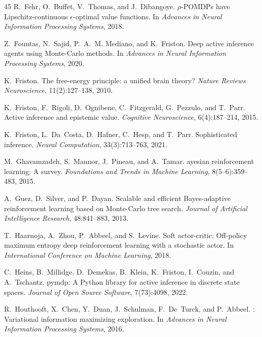 \documentclass{article}
\begin{document}
{\begin{thebibliography}{45}
R.~Fehr, O.~Buffet, V.~Thomas, and J.~Dibangoye.
\newblock $\rho$-{POMDP}s have {L}ipschitz-continuous $\epsilon$-optimal value functions.
\newblock In \emph{Advances in Neural Information Processing Systems}, 2018.

Z.~Fountas, N.~Sajid, P.~A.~M. Mediano, and K.~Friston.
\newblock Deep active inference agents using {M}onte-{C}arlo methods.
\newblock In \emph{Advances in Neural Information Processing Systems}, 2020.

K.~Friston.
\newblock The free-energy principle: a unified brain theory?
\newblock \emph{Nature Reviews Neuroscience}, 11(2):127--138, 2010.

K.~Friston, F.~Rigoli, D.~Ognibene, C.~Fitzgerald, G.~Pezzulo, and T.~Parr.
\newblock Active inference and epistemic value.
\newblock \emph{Cognitive Neuroscience}, 6(4):187--214, 2015.

K.~Friston, L.~Da~Costa, D.~Hafner, C.~Hesp, and T.~Parr.
\newblock Sophisticated inference.
\newblock \emph{Neural Computation}, 33(3):713--763, 2021.

M.~Ghavamzadeh, S.~Mannor, J.~Pineau, and A.~Tamar.
ayesian reinforcement learning: A survey.
\newblock \emph{Foundations and Trends in Machine Learning}, 8(5--6):359--483, 2015.

A.~Guez, D.~Silver, and P.~Dayan.
\newblock Scalable and efficient {B}ayes-adaptive reinforcement learning based on {M}onte-{C}arlo tree search.
\newblock \emph{Journal of Artificial Intelligence Research}, 48:841--883, 2013.

T.~Haarnoja, A.~Zhou, P.~Abbeel, and S.~Levine.
\newblock Soft actor-critic: Off-policy maximum entropy deep reinforcement learning with a stochastic actor.
\newblock In \emph{International Conference on Machine Learning}, 2018.

C.~Heins, B.~Millidge, D.~Demekas, B.~Klein, K.~Friston, I.~Couzin, and A.~Tschantz.
\newblock pymdp: A {P}ython library for active inference in discrete state spaces.
\newblock \emph{Journal of Open Source Software}, 7(73):4098, 2022.

R.~Houthooft, X.~Chen, Y.~Duan, J.~Schulman, F.~De~Turck, and P.~Abbeel.
: Variational information maximizing exploration.
\newblock In \emph{Advances in Neural Information Processing Systems}, 2016.


\end{thebibliography}}
\end{document}
